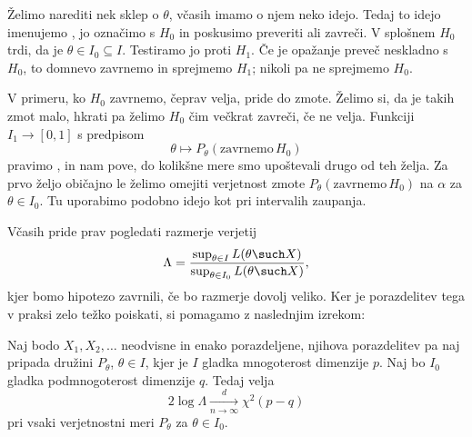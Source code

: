 
Želimo narediti nek sklep o $\theta$, včasih imamo o njem neko idejo.
Tedaj to idejo imenujemo , jo označimo s $H_0$ in
poskusimo preveriti ali zavreči.
V splošnem $H_0$ trdi, da je $\theta \in I_0 \subseteq I$.
Testiramo jo proti  $H_1$.
Če je opažanje preveč neskladno s $H_0$, to domnevo zavrnemo in sprejmemo $H_1$;
nikoli pa ne sprejmemo $H_0$.

V primeru, ko $H_0$ zavrnemo, čeprav velja, pride do zmote.
Želimo si, da je takih zmot malo, hkrati pa želimo $H_0$ čim večkrat zavreči, če
ne velja.
Funkciji $I_1 \to [0,1]$ s predpisom
\[
  \theta \mapsto P_\theta(\text{zavrnemo}\,H_0)
\]
pravimo , in nam pove, do kolikšne mere smo upoštevali
drugo od teh želja.
Za prvo željo običajno le želimo omejiti verjetnost zmote
$P_\theta(\text{zavrnemo}\,H_0)$ na $\alpha$ za $\theta \in I_0$.
Tu uporabimo podobno idejo kot pri intervalih zaupanja.


Včasih pride prav pogledati razmerje verjetij
\[
  \Lambda = \frac{\sup_{\theta \in I} L(\theta \such X)}{\sup_{\theta \in I_0}
	L(\theta \such X)},
\]
kjer bomo hipotezo zavrnili, če bo razmerje dovolj veliko.
Ker je porazdelitev tega v praksi zelo težko poiskati, si pomagamo z naslednjim
izrekom:

\begin{izrek}[Wilks]
  Naj bodo $X_1, X_2, \ldots$ neodvisne in enako porazdeljene, njihova
  porazdelitev pa naj pripada družini $P_\theta$, $\theta \in I$, kjer je $I$
  gladka mnogoterost dimenzije $p$.
  Naj bo $I_0$ gladka podmnogoterost dimenzije $q$.
  Tedaj velja
  \[
	2 \log \Lambda \xrightarrow[n \to \infty]{d} \chi^2(p-q)
  \]
  pri vsaki verjetnostni meri $P_\theta$ za $\theta \in I_0$.
\end{izrek}


